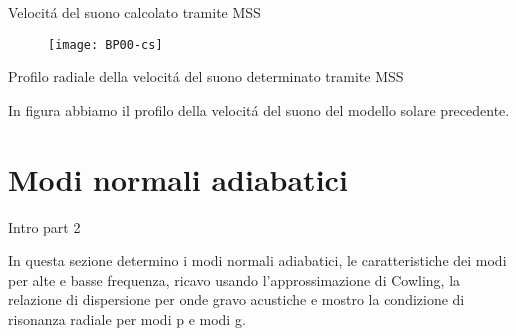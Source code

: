 \documentclass[10pt,xcolor={usenames},fleqn,mathserif,serif]{beamer}
\begin{document}
\begin{frame}{Velocit\'a del suono calcolato tramite MSS}

\begin{figure}[!ht]
\texttt{[image: BP00-cs]}
\end{figure}

\end{frame}

\begin{wordonframe}{Profilo radiale della velocit\'a del suono determinato tramite MSS}

In figura abbiamo il profilo della velocit\'a del suono del modello solare precedente.

\end{wordonframe}


\part{Modi normali adiabatici}

\frame{\partpage}



\begin{wordonframe}{Intro part 2}

In questa sezione determino i modi normali adiabatici, le caratteristiche dei modi per alte e basse frequenza, ricavo usando l'approssimazione di Cowling, la relazione di dispersione per onde gravo acustiche e mostro la condizione di risonanza radiale per modi p e modi g.

\end{wordonframe}
\end{document}
